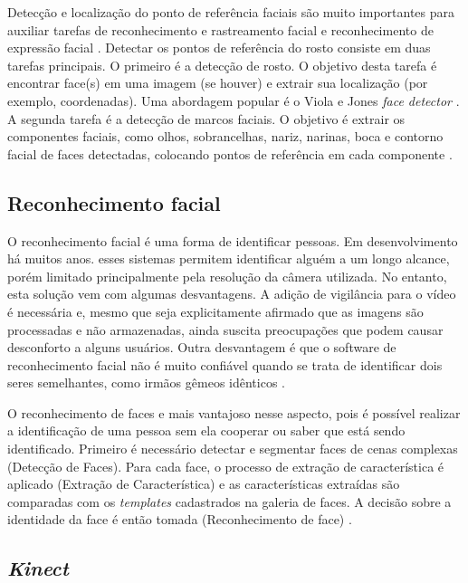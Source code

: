Detecção e localização do ponto de referência faciais são muito importantes para auxiliar tarefas de reconhecimento e rastreamento facial e reconhecimento de expressão facial \cite{cceliktutan2013comparative}. Detectar os pontos de referência do rosto consiste em duas tarefas principais. O primeiro é a detecção de rosto. O objetivo desta tarefa é encontrar face(s) em uma imagem (se houver) e extrair sua localização (por exemplo, coordenadas). Uma abordagem popular é o Viola e Jones \textit{face detector} \cite{viola2001rapid,viola2004robust}. A segunda tarefa é a detecção de marcos faciais. O objetivo é extrair os componentes faciais, como olhos, sobrancelhas, nariz, narinas, boca e contorno facial de faces detectadas, colocando pontos de referência em cada componente \cite{zhang2010survey}.

 \subsection{Reconhecimento facial}\label{sec:recFacial}
O reconhecimento facial é uma forma de identificar pessoas. Em desenvolvimento há muitos anos. esses sistemas permitem identificar alguém a um longo alcance, porém limitado principalmente pela resolução da câmera utilizada. No entanto, esta solução vem com algumas desvantagens. A adição de vigilância para o vídeo é necessária e, mesmo que seja explicitamente afirmado que as imagens são processadas e não armazenadas, ainda suscita preocupações que podem causar desconforto a alguns usuários. Outra desvantagem é que o software de reconhecimento facial não é muito confiável quando se trata de identificar dois seres semelhantes, como irmãos gêmeos idênticos \cite{fitzpatrick2013real}.

O reconhecimento de faces e mais vantajoso nesse aspecto, pois é possível realizar a identificação de uma pessoa sem ela cooperar ou saber que está sendo identificado. Primeiro é necessário detectar e segmentar faces de cenas complexas (Detecção de Faces). Para cada face, o processo de extração de característica é aplicado (Extração de Característica) e as características extraídas são comparadas com os \textit{templates} cadastrados na galeria de faces. A decisão sobre a identidade da face é então tomada (Reconhecimento de face) \cite{cardia2015avaliaccao}.   
 
 \subsection{\textit{Kinect}}\label{sec:kinect}
 
